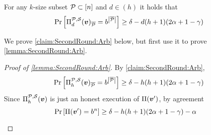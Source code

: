\newcommand{\ds}{{d^\ast}}
\begin{claim}\label{claim:SecondRound:Arb}
For any $k$-size
subset $\mathcal{P}\subset [n]$ and $d\in (h)$ it holds that
\[
\Pr_{}\left[\Pi^{\mathcal{P},\mathcal{S}}_d({ \boldsymbol{v}})_{\overline{\mathcal{P}}} = b^{\left|{\overline{\mathcal{P}}}\right|}\right] \ge \delta- d (h+1)(2\alpha + 1-\gamma)
\]
\end{claim}
We prove \cref{claim:SecondRound:Arb} below, but first use it to prove \cref{lemma:SecondRound:Arb}.
\begin{proof}[Proof of \cref{lemma:SecondRound:Arb}]
By \cref{claim:SecondRound:Arb},
\begin{align*}
\Pr_{}\left[\Pi^{\mathcal{P},\mathcal{S}}_h({ \boldsymbol{v}})_{\overline{\mathcal{P}}} = b^{\left|{\overline{\mathcal{P}}}\right|}\right] \ge \delta - h(h+1)(2\alpha + 1-\gamma)
\end{align*}
Since $\Pi^{\mathcal{P},\mathcal{S}}_h({ \boldsymbol{v}})$ is just an honest execution of $\Pi({ \boldsymbol{v}}')$, by agreement
\begin{align*}
\Pr_{}\left[\Pi({ \boldsymbol{v}}') = b^n\right] &\ge \delta - h(h+1)(2\alpha + 1-\gamma) - \alpha 
\end{align*}
\end{proof}




